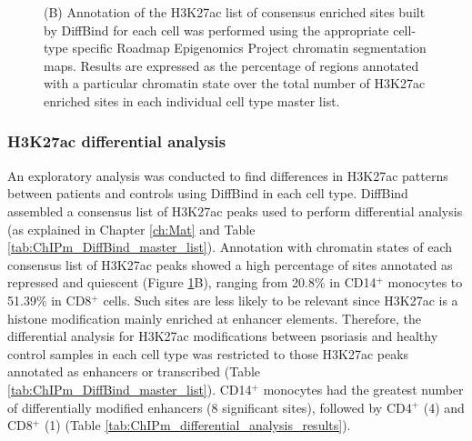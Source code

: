 \begin{figure}[htbp]
{(B) Annotation of the H3K27ac list of consensus enriched sites built by DiffBind for each cell was performed using the appropriate cell-type specific Roadmap Epigenomics Project chromatin segmentation maps. Results are expressed as the percentage of regions annotated with a particular chromatin state over the total number of H3K27ac enriched sites in each individual cell type master list.}
\label{figure:ChIPm_PCA_and_chromatin_states}
\end{figure}


\subsubsection{H3K27ac differential analysis}
An exploratory analysis was conducted to find differences in H3K27ac patterns between patients and controls using DiffBind in each cell type. DiffBind assembled a consensus list of H3K27ac peaks used to perform differential analysis (as explained in Chapter \ref{ch:Mat} and Table \ref{tab:ChIPm_DiffBind_master_list}). Annotation with chromatin states of each consensus list of H3K27ac peaks showed a high percentage of sites annotated as repressed and quiescent (Figure \ref{figure:ChIPm_PCA_and_chromatin_states}B), ranging from 20.8\% in CD14$^+$ monocytes to 51.39\% in CD8$^+$ cells. Such sites are less likely to be relevant since H3K27ac is a histone modification mainly enriched at enhancer elements. Therefore, the differential analysis for H3K27ac modifications between psoriasis and healthy control samples in each cell type was restricted to those H3K27ac peaks annotated as enhancers or transcribed (Table \ref{tab:ChIPm_DiffBind_master_list}). CD14$^+$ monocytes had the greatest number of differentially modified enhancers (8 significant sites), followed by CD4$^+$ (4) and CD8$^+$ (1) (Table \ref{tab:ChIPm_differential_analysis_results}).



